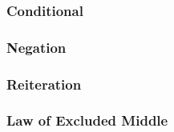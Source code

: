 \separatepfs
\begin{multicols}{2}
\subsubsection*{Conditional}

\begin{pf}
	\open
		\ellipsesline
	\close
\end{pf}

\vfill\null
\columnbreak

\begin{pf}
	 
\end{pf}
\end{multicols}

\separatepfs
\begin{multicols}{2}
\subsubsection*{Negation}

\begin{pf}
\open
	\ellipsesline
	\ellipsesline
\close
{}
\end{pf}

\columnbreak

\begin{pf}
\open
	\ellipsesline
	\ellipsesline
\close
{}
\end{pf}
\end{multicols}
\separatepfs
\begin{multicols}{2}
\subsubsection*{Reiteration}

\begin{pf}
	 
\end{pf}

\subsubsection*{Law of Excluded Middle}
\begin{pf}
	\LEM
\end{pf}
\end{multicols}



